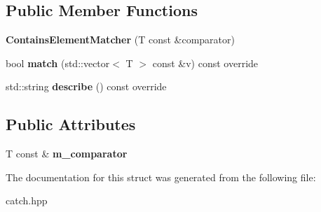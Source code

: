 \subsection*{Public Member Functions}
\begin{DoxyCompactItemize}
\item 
{\bfseries Contains\+Element\+Matcher} (T const \&comparator)\hypertarget{structCatch_1_1Matchers_1_1Vector_1_1ContainsElementMatcher_a6a05740b5d3f89fac8de84ac0cff7b93}{}\label{structCatch_1_1Matchers_1_1Vector_1_1ContainsElementMatcher_a6a05740b5d3f89fac8de84ac0cff7b93}

\item 
bool {\bfseries match} (std\+::vector$<$ T $>$ const \&v) const override\hypertarget{structCatch_1_1Matchers_1_1Vector_1_1ContainsElementMatcher_a6a4be6e5642e267433d370649beb0fac}{}\label{structCatch_1_1Matchers_1_1Vector_1_1ContainsElementMatcher_a6a4be6e5642e267433d370649beb0fac}

\item 
std\+::string {\bfseries describe} () const override\hypertarget{structCatch_1_1Matchers_1_1Vector_1_1ContainsElementMatcher_aea3b674389a0afd82af6ba4b10f86ae6}{}\label{structCatch_1_1Matchers_1_1Vector_1_1ContainsElementMatcher_aea3b674389a0afd82af6ba4b10f86ae6}

\end{DoxyCompactItemize}
\subsection*{Public Attributes}
\begin{DoxyCompactItemize}
\item 
T const \& {\bfseries m\+\_\+comparator}\hypertarget{structCatch_1_1Matchers_1_1Vector_1_1ContainsElementMatcher_ab7eada6c4bbce1d21b44773262f9cb23}{}\label{structCatch_1_1Matchers_1_1Vector_1_1ContainsElementMatcher_ab7eada6c4bbce1d21b44773262f9cb23}

\end{DoxyCompactItemize}


The documentation for this struct was generated from the following file\+:\begin{DoxyCompactItemize}
\item 
catch.\+hpp\end{DoxyCompactItemize}

